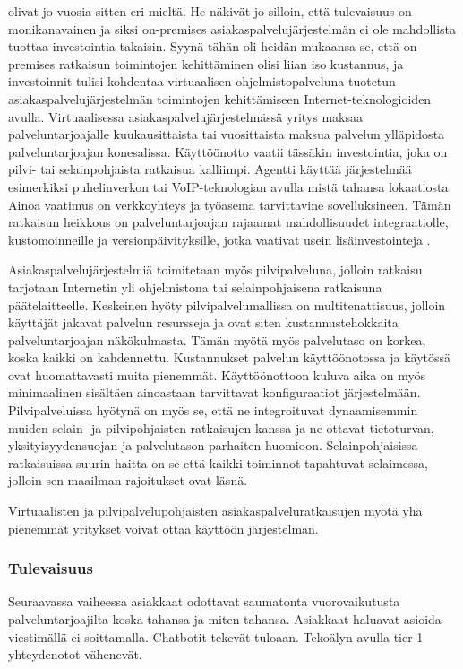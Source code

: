 \documentclass[finnish,12pt,a4paper,pdftex]{article}
\begin{document}
\cite{vcc} olivat jo vuosia sitten eri mieltä. He näkivät jo silloin, että tulevaisuus on monikanavainen ja siksi on-premises asiakaspalvelujärjestelmän ei ole mahdollista tuottaa investointia takaisin. Syynä tähän oli heidän mukaansa se, että on-premises ratkaisun toimintojen kehittäminen olisi liian iso kustannus, ja investoinnit tulisi kohdentaa virtuaalisen ohjelmistopalveluna tuotetun asiakaspalvelujärjestelmän toimintojen kehittämiseen Internet-teknologioiden avulla. Virtuaalisessa asiakaspalvelujärjestelmässä yritys maksaa palveluntarjoajalle kuukausittaista tai vuosittaista maksua palvelun ylläpidosta palveluntarjoajan konesalissa. Käyttöönotto vaatii tässäkin investointia, joka on pilvi- tai selainpohjaista ratkaisua kalliimpi. Agentti käyttää järjestelmää esimerkiksi puhelinverkon tai VoIP-teknologian avulla mistä tahansa lokaatiosta. Ainoa vaatimus on verkkoyhteys ja työasema tarvittavine sovelluksineen. Tämän ratkaisun heikkous on palveluntarjoajan rajaamat  mahdollisuudet integraatiolle, kustomoinneille ja versionpäivityksille, jotka vaativat usein lisäinvestointeja \citep{talkdesk}.  

Asiakaspalvelujärjestelmiä toimitetaan myös pilvipalveluna, jolloin ratkaisu tarjotaan Internetin yli ohjelmistona tai selainpohjaisena ratkaisuna päätelaitteelle. Keskeinen hyöty pilvipalvelumallissa on multitenattisuus, jolloin käyttäjät jakavat palvelun resursseja ja ovat siten kustannustehokkaita palveluntarjoajan näkökulmasta. Tämän myötä myös palvelutaso on korkea, koska kaikki on kahdennettu. Kustannukset palvelun käyttöönotossa ja käytössä ovat huomattavasti muita pienemmät. Käyttöönottoon kuluva aika on myös minimaalinen sisältäen ainoastaan tarvittavat konfiguraatiot järjestelmään. Pilvipalveluissa hyötynä on myös se, että ne integroituvat dynaamisemmin muiden selain- ja pilvipohjaisten ratkaisujen kanssa ja ne ottavat tietoturvan, yksityisyydensuojan ja palvelutason parhaiten huomioon. Selainpohjaisissa ratkaisuissa suurin haitta on se että kaikki toiminnot tapahtuvat selaimessa, jolloin sen maailman rajoitukset ovat läsnä. \citep{talkdesk}

Virtuaalisten ja pilvipalvelupohjaisten asiakaspalveluratkaisujen myötä yhä pienemmät yritykset voivat ottaa käyttöön järjestelmän.

\subsubsection{Tulevaisuus}

Seuraavassa vaiheessa asiakkaat odottavat saumatonta vuorovaikutusta palveluntarjoajilta koska tahansa ja miten tahansa.
Asiakkaat haluavat asioida viestimällä ei soittamalla.
Chatbotit tekevät tuloaan.
Tekoälyn avulla tier 1 yhteydenotot vähenevät.
\end{document}
